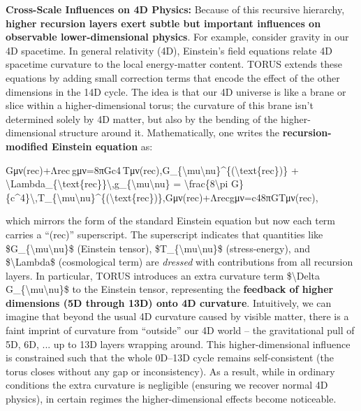 \documentclass[]{article}
\begin{document}
\textbf{Cross-Scale Influences on 4D Physics:} Because of this recursive
hierarchy, \textbf{higher recursion layers exert subtle but important
influences on observable lower-dimensional physics}. For example,
consider gravity in our 4D spacetime. In general relativity (4D),
Einstein's field equations relate 4D spacetime curvature to the local
energy-matter content. TORUS extends these equations by adding small
correction terms that encode the effect of the other dimensions in the
14D cycle. The idea is that our 4D universe is like a brane or slice
within a higher-dimensional torus; the curvature of this brane isn't
determined solely by 4D matter, but also by the bending of the
higher-dimensional structure around it. Mathematically, one writes the
\textbf{recursion-modified Einstein equation} as:

Gμν(rec)+Λrec gμν=8πGc4 Tμν(rec),G\_\{\textbackslash{}mu\textbackslash{}nu\}\^{}\{(\textbackslash{}text\{rec\})\}
+
\textbackslash{}Lambda\_\{\textbackslash{}text\{rec\}\}\textbackslash{},g\_\{\textbackslash{}mu\textbackslash{}nu\}
= \textbackslash{}frac\{8\textbackslash{}pi
G\}\{c\^{}4\}\textbackslash{},T\_\{\textbackslash{}mu\textbackslash{}nu\}\^{}\{(\textbackslash{}text\{rec\})\},Gμν(rec)​+Λrec​gμν​=c48πG​Tμν(rec)​,

which mirrors the form of the standard Einstein equation but now each
term carries a ``(rec)'' superscript​. The superscript indicates that
quantities like \$G\_\{\textbackslash{}mu\textbackslash{}nu\}\$
(Einstein tensor), \$T\_\{\textbackslash{}mu\textbackslash{}nu\}\$
(stress-energy), and \$\textbackslash{}Lambda\$ (cosmological term) are
\emph{dressed} with contributions from all recursion layers​. In
particular, TORUS introduces an extra curvature term
\$\textbackslash{}Delta G\_\{\textbackslash{}mu\textbackslash{}nu\}\$ to
the Einstein tensor, representing the \textbf{feedback of higher
dimensions (5D through 13D) onto 4D curvature}​. Intuitively, we can
imagine that beyond the usual 4D curvature caused by visible matter,
there is a faint imprint of curvature from ``outside'' our 4D world --
the gravitational pull of 5D, 6D, ... up to 13D layers wrapping around.
This higher-dimensional influence is constrained such that the whole
0D--13D cycle remains self-consistent (the torus closes without any gap
or inconsistency). As a result, while in ordinary conditions the extra
curvature is negligible (ensuring we recover normal 4D physics), in
certain regimes the higher-dimensional effects become noticeable.
\end{document}
